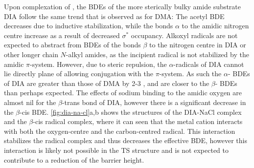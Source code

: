 \begin{doublespace}
Upon complexation of , the BDEs of the more sterically bulky amide
substrate DIA follow the same trend that is observed as for DMA: The acetyl
 BDE decreases due to inductive stabilization, while the  bonds
$\alpha$ to the amidic nitrogen centre increase as a result of decreased
 $\sigma^*$ occupancy. Alkoxyl radicals are not expected to abstract
from  BDEs of the bonds $\beta$ to the nitrogen centre in DIA or other
longer chain $N$-alkyl amides, as the incipient radical is not stabilized by the
amidic $\pi$-system. However, due to steric repulsion, the $\alpha$-radicals of
DIA cannot lie directly plane of allowing conjugation with the $\pi$-system. As
such the $\alpha$- BDEs of DIA are greater than those of DMA by 2-3
\kcalmol, and are closer to the $\beta$- BDEs than perhaps expected. The
effects of sodium binding to the amidic oxygen are almost nil for the
$\beta$-trans  bond of DIA, however there is a significant decrease in
the $\beta$-cis  BDE. \ref{fig:dia-na-cl}a,b shows the structures of the
DIA-NaCl complex and the $\beta$-cis radical complex, where it can seen that the
metal cation interacts with both the oxygen-centre and the carbon-centred
radical. This interaction stabilizes the radical complex and thus decreases the
effective BDE, however this interaction is likely not possible in the TS
structure and is not expected to contribute to a reduction of the barrier
height.

\begin{figure}[!htbp]
	\centering



\end{figure}
\end{doublespace}
